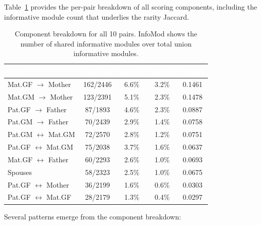 \documentclass{../yalumba}
\begin{document}
Table~\ref{tab:components} provides the per-pair breakdown of all scoring
components, including the informative module count that underlies the rarity
Jaccard.

\begin{table}[H]
\centering
\tablestyle
\caption{Component breakdown for all 10 pairs.  InfoMod shows the number
  of shared informative modules over total union informative modules.}
\label{tab:components}
\begin{tabular}{@{}lcccc@{}}
\toprule
\rowcolor{table-header}
\textcolor{white}{\textbf{Pair}} &
\textcolor{white}{\textbf{InfoMod}} &
\textcolor{white}{\textbf{Info \%}} &
\textcolor{white}{\textbf{Rarity}} &
\textcolor{white}{\textbf{Cosine}} \\
\midrule
Mat.GF $\to$ Mother    & 162/2446 & 6.6\% & 3.2\% & 0.1461 \\
Mat.GM $\to$ Mother    & 123/2391 & 5.1\% & 2.3\% & 0.1478 \\
Pat.GF $\to$ Father    &  87/1893 & 4.6\% & 2.3\% & 0.0887 \\
Pat.GM $\to$ Father    &  70/2439 & 2.9\% & 1.4\% & 0.0758 \\
\arrayrulecolor{yalumba-wine}\midrule\arrayrulecolor{black}
Pat.GM $\leftrightarrow$ Mat.GM  &  72/2570 & 2.8\% & 1.2\% & 0.0751 \\
Pat.GF $\leftrightarrow$ Mat.GM  &  75/2038 & 3.7\% & 1.6\% & 0.0637 \\
Mat.GF $\leftrightarrow$ Father  &  60/2293 & 2.6\% & 1.0\% & 0.0693 \\
Spouses                          &  58/2323 & 2.5\% & 1.0\% & 0.0675 \\
Pat.GF $\leftrightarrow$ Mother  &  36/2199 & 1.6\% & 0.6\% & 0.0303 \\
Pat.GF $\leftrightarrow$ Mat.GF  &  28/2179 & 1.3\% & 0.4\% & 0.0297 \\
\bottomrule
\end{tabular}
\end{table}

Several patterns emerge from the component breakdown:
\end{document}
